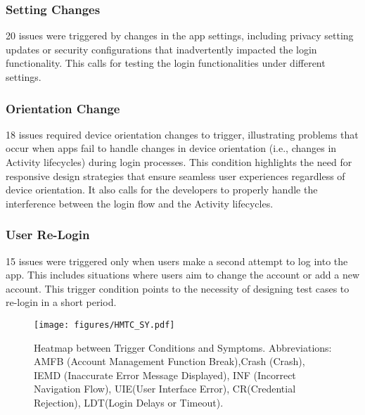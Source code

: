 \subsubsection{Setting Changes}
20 issues were triggered by changes in the app settings, including privacy setting updates or security configurations that inadvertently impacted the login functionality.
This calls for testing the login functionalities under different settings.

\subsubsection{Orientation Change}
18 issues required device orientation changes to trigger, illustrating problems that occur when apps fail to handle changes in device orientation (i.e., changes in Activity lifecycles) during login processes. This condition highlights the need for responsive design strategies that ensure seamless user experiences regardless of device orientation.
It also calls for the developers to properly handle the interference between the login flow and the Activity lifecycles.

\subsubsection{User Re-Login}
15 issues were triggered only when users make a second attempt to log into the app.
This includes situations where users aim to change the account or add a new account.
This trigger condition points to the necessity of designing test cases to re-login in a short period.



\begin{figure}[ht!]
  \centering
  \texttt{[image: figures/HMTC\_SY.pdf]}
  \caption{Heatmap between Trigger Conditions and Symptoms. Abbreviations: AMFB (Account Management Function Break),Crash (Crash), IEMD (Inaccurate Error Message Displayed), INF (Incorrect Navigation Flow), UIE(User Interface Error), CR(Credential Rejection), LDT(Login Delays or Timeout).}
  \label{fig:btTCvsSymp}
\end{figure}

